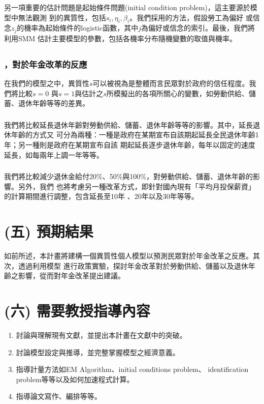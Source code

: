 \documentclass[12pt]{article}
\begin{document}
\begin{CJK*}{UTF8}{bkai}
另一項重要的估計問題是起始條件問題(initial condition problem)，這主要源於模型中無法觀測
到的異質性，包括$s_i,\eta_i,\beta_i$。我們採用\cite{french2011}的方法，假設勞工為偏好
或信念$z_j$的機率為起始條件的logistic函數，其中$j$為偏好或信念的索引。最後，我們將利用SMM
估計主要模型的參數，包括各機率分布隨機變數的取值與機率。

\subsection*{}
\subsubsection*{，對於年金改革的反應}
在我們的模型之中，異質性$s$可以被視為是整體而言民眾對於政府的信任程度。我們將比較$s=0$
與$s=1$與估計之$s$所模擬出的各項所關心的變數，如勞動供給、儲蓄、退休年齡等等的差異。
\subsubsection*{}
我們將比較延長退休年齡對勞動供給、儲蓄、退休年齡等等的影響。其中，延長退休年齡的方式又
可分為兩種：一種是政府在某期宣布自該期起延長全民退休年齡1年；另一種則是政府在某期宣布自該
期起延長逐步退休年齡，每年以固定的速度延長，如每兩年上調一年等等。
\subsubsection*{}
我們將比較減少退休金給付20\%、50\%與100\%，對勞動供給、儲蓄、退休年齡的影響。另外，我們
也將考慮另一種改革方式，即針對國內現有「平均月投保薪資」的計算期間進行調整，包含延長至10年
、20年以及30年等等。

\section*{\normalfont(五) 預期結果}
如前所述，本計畫將建構一個異質性個人模型以預測民眾對於年金改革之反應。其次，透過利用模型
進行政策實驗，探討年金改革對於勞動供給、儲蓄以及退休年齡之影響，從而對年金改革提出建議。
\section*{\normalfont(六) 需要教授指導內容}
\begin{enumerate}
    \item 討論與理解現有文獻，並提出本計畫在文獻中的突破。
    \item 討論模型設定與推導，並完整掌握模型之經濟意義。
    \item 指導計量方法如EM Algorithm、initial conditions problem、
    identification problem等等以及如何加速程式計算。
    \item 指導論文寫作、編排等等。
\end{enumerate}



\end{CJK*}
\end{document}
